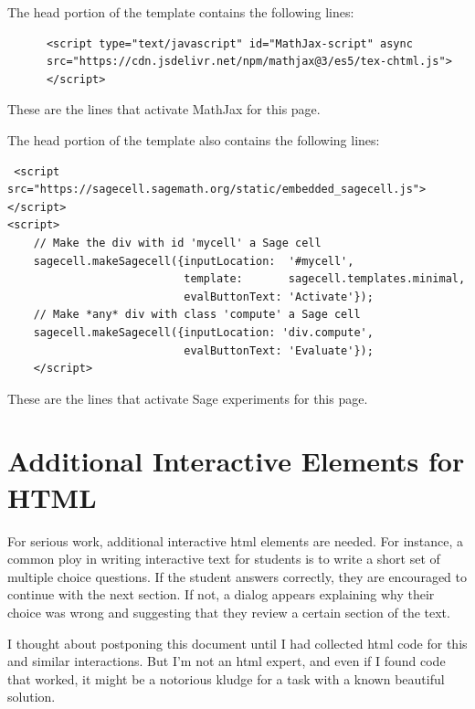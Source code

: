 \documentclass[11pt, oneside]{article}   	%
\begin{document}
 The head portion of the template contains the following lines:
 \begin{verbatim}
      <script type="text/javascript" id="MathJax-script" async
      src="https://cdn.jsdelivr.net/npm/mathjax@3/es5/tex-chtml.js">
      </script> 
 \end{verbatim}
 These are the lines that activate MathJax for this page.
 
 \newpage
 The head portion of the template also contains the following lines:
 \begin{verbatim}
 <script src="https://sagecell.sagemath.org/static/embedded_sagecell.js"></script>
<script>
    // Make the div with id 'mycell' a Sage cell
    sagecell.makeSagecell({inputLocation:  '#mycell',
                           template:       sagecell.templates.minimal,
                           evalButtonText: 'Activate'});
    // Make *any* div with class 'compute' a Sage cell
    sagecell.makeSagecell({inputLocation: 'div.compute',
                           evalButtonText: 'Evaluate'});
    </script>
 \end{verbatim}
 These are the lines that activate Sage experiments for this page.
\vspace{.2in}



 \section{Additional Interactive Elements for HTML}
 
For serious work, additional interactive html elements are needed. For instance, a common ploy in writing interactive text for students is to write a short set of multiple choice questions. If the student answers correctly, they are encouraged to continue with the next section. If not, a dialog appears explaining why their choice was wrong and suggesting that they review a certain section of the text.

I thought about postponing this document until I had collected html code for this and similar interactions. But I'm not an html expert, and even if I found code that worked, it might be a notorious kludge for a task with a known beautiful solution. 
\end{document}
